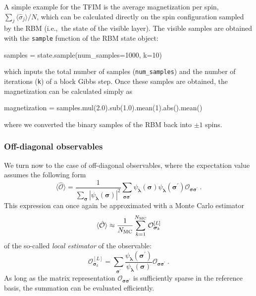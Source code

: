 \documentclass[submission, Phys, hidelnks]{SciPost}
\begin{document}
A simple example for the TFIM is the average magnetization per spin, $\sum_j\langle\hat{\sigma}_j\rangle/N$, which can be calculated directly on the spin configuration sampled by the RBM (i.e.,~the state of the visible layer). The visible samples are obtained with the \verb|sample| function of the RBM state object:
\begin{python}
samples = state.sample(num_samples=1000, k=10)
\end{python}
which inputs the total number of samples (\verb|num_samples|) and the number of iterations (\verb|k|) of a block Gibbs step. Once these samples are obtained, the magnetization can be calculated simply as
\begin{python}
magnetization = samples.mul(2.0).sub(1.0).mean(1).abs().mean()
\end{python}
where we converted the binary samples of the RBM back into $\pm 1$ spins.


\subsubsection{Off-diagonal observables}

We turn now to the case of off-diagonal observables, where the expectation value assumes the following form
\begin{equation}
    \langle \hat{\mathcal{O}} \rangle = \frac{1}{\sum_{\bm{\sigma}} |\psi_{\bm{\lambda}}(\bm{\sigma})|^2}
    \sum_{\bm{\sigma\sigma}^\prime} \psi_{\bm{\lambda}}(\bm{\sigma})
    \psi_{\bm{\lambda}}(\bm{\sigma}^\prime)\mathcal{O}_{\bm{\sigma\sigma}^\prime}\:.
\end{equation}
This expression can once again be approximated with a Monte Carlo estimator 
\begin{equation}
    \langle \hat{\mathcal{O}}\rangle \approx \frac{1}{N_{\rm MC}} \sum_{k=1}^{N_{\rm MC}} \mathcal{O}^{[L]}_{\bm{\sigma}_k}
\end{equation}
of the so-called \emph{local estimator} of the observable: 
\begin{equation}
    \mathcal{O}^{[L]}_{\bm{\sigma}_k}=\sum_{\bm{\sigma}^\prime}\frac{\psi_{\bm{\lambda}}(\bm{\sigma}^\prime)}{\psi_{\bm{\lambda}}(\bm{\sigma})} \mathcal{O}_{\bm{\sigma\sigma}^\prime}\:.
\end{equation}
As long as the matrix representation $\mathcal{O}_{\bm{\sigma\sigma}^\prime}$ is sufficiently sparse in the reference basis, the summation can be evaluated efficiently. 
\end{document}
